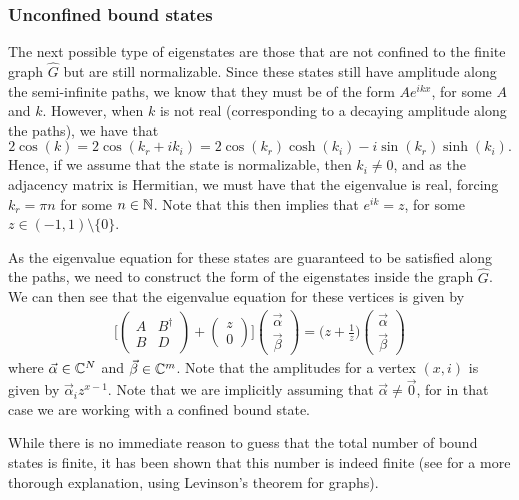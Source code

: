 \documentclass[../thesis-main/thesis-main]{subfiles}
\begin{document}
\subsubsection{Unconfined bound states}

The next possible type of eigenstates are those that are not confined to the finite graph $\widehat{G}$ but are still normalizable.  Since these states still have amplitude along the semi-infinite paths, we know that they must be of the form $Ae^{i k x}$, for some $A$ and $k$.  However, when $k$ is not real (corresponding to a decaying amplitude along the paths), we have that
\begin{equation}
  2 \cos(k) = 2\cos(k_r + i k_i) = 2 \cos(k_r) \cosh(k_i) - i \sin(k_r) \sinh(k_i).
\end{equation}
Hence, if we assume that the state is normalizable, then $k_i \neq 0$, and as the adjacency matrix is Hermitian, we must have that the eigenvalue is real, forcing $k_r = \pi n$ for some $n\in \mathbb{N}$.  Note that this then implies that $e^{i k} = z$, for some $z\in(-1,1)\setminus\{0\}$.

As the eigenvalue equation for these states are guaranteed to be satisfied along the paths, we need to construct the form of the eigenstates inside the graph $\widehat{G}$.  We can then see that the eigenvalue equation for these vertices is given by
\begin{align}
\bigg[
  \begin{pmatrix} 
    A & B^\dag\\
    B & D
  \end{pmatrix}
  + \begin{pmatrix} 
    z \\
    0
  \end{pmatrix}
  \bigg] \begin{pmatrix}
    \vec{\alpha}\\
    \vec{\beta}
  \end{pmatrix} = \Big(z + \frac{1}{z}\Big) \begin{pmatrix} 
    \vec{\alpha}\\
    \vec{\beta}
  \end{pmatrix}
\end{align}
where $\vec{\alpha} \in \mathbb{C}^N$ and $\vec{\beta}\in \mathbb{C}^m$.  Note that the amplitudes for a vertex $(x,i)$ is given by $\vec{\alpha}_i z^{x-1}$.  Note that we are implicitly assuming that $\vec{\alpha} \neq \vec{0}$, for in that case we are working with a confined bound state.  

While there is no immediate reason to guess that the total number of bound states is finite, it has been shown that this number is indeed finite (see \cite{CG12} for a more thorough explanation, using Levinson's theorem for graphs).
\end{document}

